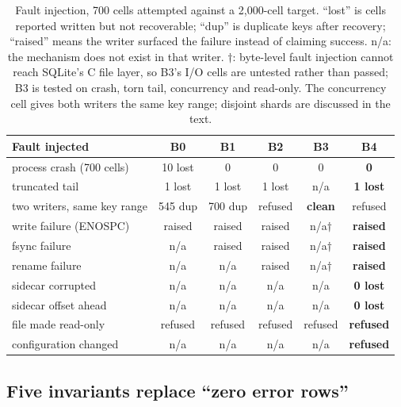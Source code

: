 \begin{table}[t]
\centering
\footnotesize
\setlength{\tabcolsep}{4pt}
\caption{Fault injection, 700 cells attempted against a 2{,}000-cell target.
``lost'' is cells reported written but not recoverable; ``dup'' is duplicate keys
after recovery; ``raised'' means the writer surfaced the failure instead of
claiming success. n/a: the mechanism does not exist in that writer. $\dagger$:
byte-level fault injection cannot reach SQLite's C file layer, so B3's I/O cells
are untested rather than passed; B3 is tested on crash, torn tail, concurrency and
read-only. The concurrency cell gives both writers the same key range; disjoint
shards are discussed in the text.}
\label{tab:faults}
\begin{tabular}{lccccc}
\toprule
Fault injected & B0 & B1 & B2 & B3 & \textbf{B4} \\
\midrule
process crash (700 cells) & 10 lost & 0 & 0 & 0 & \textbf{0} \\
truncated tail & 1 lost & 1 lost & 1 lost & n/a & \textbf{1 lost} \\
two writers, same key range & 545 dup & 700 dup & refused & \textbf{clean} & refused \\
write failure (ENOSPC) & raised & raised & raised & n/a$\dagger$ & \textbf{raised} \\
fsync failure & n/a & raised & raised & n/a$\dagger$ & \textbf{raised} \\
rename failure & n/a & n/a & raised & n/a$\dagger$ & \textbf{raised} \\
sidecar corrupted & n/a & n/a & n/a & n/a & \textbf{0 lost} \\
sidecar offset ahead & n/a & n/a & n/a & n/a & \textbf{0 lost} \\
file made read-only & refused & refused & refused & refused & \textbf{refused} \\
configuration changed & n/a & n/a & n/a & n/a & \textbf{refused} \\
\bottomrule
\end{tabular}
\end{table}

\subsection{Five invariants replace ``zero error rows''}

